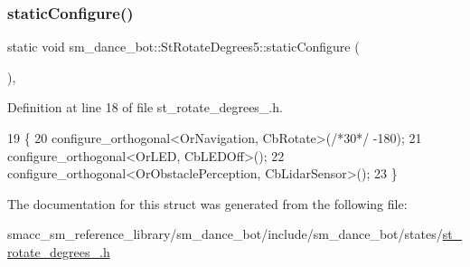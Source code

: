 \subsubsection{\texorpdfstring{static\+Configure()}{staticConfigure()}}
{\footnotesize\ttfamily static void sm\+\_\+dance\+\_\+bot\+::\+St\+Rotate\+Degrees5\+::static\+Configure (\begin{DoxyParamCaption}{ }\end{DoxyParamCaption})\hspace{0.3cm}{\ttfamily [inline]}, {\ttfamily [static]}}



Definition at line 18 of file st\+\_\+rotate\+\_\+degrees\+\_.\+h.


\begin{DoxyCode}
19   \{
20     configure\_orthogonal<OrNavigation, CbRotate>(\textcolor{comment}{/*30*/} -180);
21     configure\_orthogonal<OrLED, CbLEDOff>();
22     configure\_orthogonal<OrObstaclePerception, CbLidarSensor>();
23   \}
\end{DoxyCode}


The documentation for this struct was generated from the following file\+:\begin{DoxyCompactItemize}
\item 
smacc\+\_\+sm\+\_\+reference\+\_\+library/sm\+\_\+dance\+\_\+bot/include/sm\+\_\+dance\+\_\+bot/states/\hyperlink{sm__dance__bot_2include_2sm__dance__bot_2states_2st__rotate__degrees__5_8h}{st\+\_\+rotate\+\_\+degrees\+\_.\+h}\end{DoxyCompactItemize}
